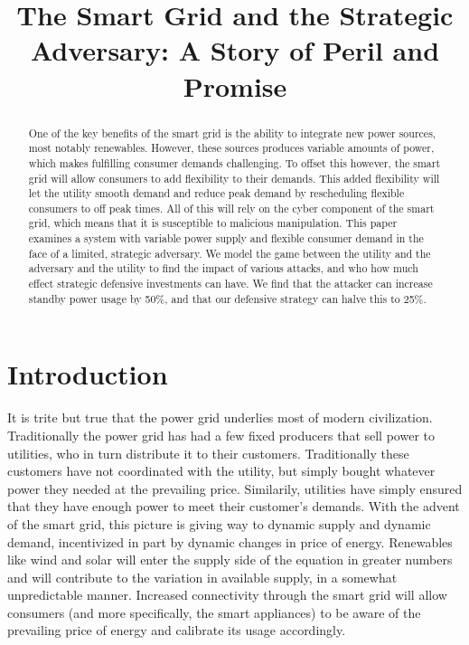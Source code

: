 \documentclass[conference]{IEEEtran}
\begin{document}
\title{The Smart Grid and the Strategic Adversary: A Story of Peril and Promise}
\thispagestyle{plain}
\pagestyle{plain}

\author{
}

\maketitle

\begin{abstract}
One of the key benefits of the smart grid is the ability to integrate new power sources, most notably renewables.  However, these sources produces variable amounts of power, which makes fulfilling consumer demands challenging.  To offset this however, the smart grid will allow consumers to add flexibility to their demands.  This added flexibility will let the utility smooth demand and reduce peak demand by rescheduling flexible consumers to off peak times.  All of this will rely on the cyber component of the smart grid, which means that it is susceptible to malicious manipulation.  This paper examines a system with variable power supply and flexible consumer demand in the face of a limited, strategic adversary.  We model the game between the utility and the adversary and the utility to find the impact of various attacks, and who how much effect strategic defensive investments can have.  We find that the attacker can increase standby power usage by 50\%, and that our defensive strategy can halve this to 25\%.

\end{abstract}

\section{Introduction}
\label{Introduction}

It is trite but true that the power grid underlies most of modern civilization.  Traditionally the power grid has had a 
few fixed producers that sell power to utilities, who in turn distribute it to their customers.  Traditionally these 
customers have not coordinated with the utility, but simply bought whatever power they needed at the prevailing price.  
Similarily, utilities have simply ensured that they have enough power to meet their customer's demands.  
With the advent of the smart grid, this picture is giving way to dynamic supply and dynamic demand, incentivized in part by dynamic changes in price of energy.  Renewables like wind and solar will enter the supply side of the equation in greater numbers and will contribute to the variation in available supply, in a somewhat unpredictable manner. Increased connectivity through the smart grid will allow consumers (and more specifically, the smart appliances) to be 
aware of the prevailing price of energy and calibrate its usage accordingly. 
\end{document}
